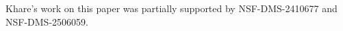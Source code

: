 \documentclass[ejsv2, noshowframe]{imsart}
\theoremstyle{plain}
\theoremstyle{definition}
\newtheorem*{example}{Example}
\theoremstyle{remark}
\newcommand{\norm}[1]{\left\lVert#1\right\rVert}
\newcommand{\w}{\omega}
\newcommand{\tr}{\text{tr}}
\newcommand{\R}{\mathbb{R}}
\newcommand{\E}{\mathbb{E}}
\renewcommand{\P}{P}
\begin{document}

\begin{funding}
Khare's work on this paper was partially supported by NSF-DMS-2410677 and NSF-DMS-2506059. 
\end{funding}









\end{document}
